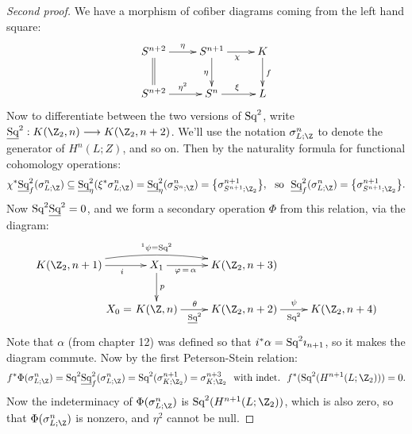 \documentclass[11pt]{article}
\begin{document}
\begin{proof}[Second proof]
We have a morphism of cofiber diagrams coming from the left hand square:
\[\xymatrix{
S^{n+2}\ar[r]^\eta\ar@{=}[d]&\ar[d]_\eta S^{n+1}\ar[r]_\chi&K\ar[d]^f\\
S^{n+2}\ar[r]^{\eta^2}&S^n\ar[r]^\xi&L
}\]
Now to differentiate between the two versions of $\textup{Sq}^2$, write
$\underline{\Squ}^2:K(\Z_2,n)\to K(\Z_2,n+2)$. We'll use the notation
$\sigma^n_{L;\Z}$ to denote the generator of $H^n(L;Z)$, and so on. Then by the
naturality formula for functional cohomology operations:
\[\chi^*\underline{\Squ}^2_f(\sigma^n_{L;\Z})
\subseteq\underline{\Squ}^2_\eta(\xi^*\sigma^n_{L;\Z})
=\underline{\Squ}^2_\eta(\sigma^n_{S^n;\Z})
=\bigl\{\sigma^{n+1}_{S^{n+1};\Z_2}\bigr\},
\text{\ \ so\ \ }
\underline{\Squ}^2_f(\sigma^n_{L;\Z})=\bigl\{\sigma^{n+1}_{S^{n+1};\Z_2}\bigr\}.
\]
Now $\textup{Sq}^2\underline{\textup{Sq}}^2=0$, and we form a secondary operation $\Phi$ from
this relation, via the diagram:
\[\xymatrix{
K(\Z_2,n+1)\ar[r]_{\ \ \ \ \ i}\ar@/^.8pc/[rr]^{^1\psi=\Squ^2}&
X_1\ar[r]_{\phi\,=\,\alpha\ \ \ \ \ \ \ \ }\ar[d]^p&K(\Z_2,n+3)\\
&%
\makebox[0in][r]{$X_0=$\ }K(\Z,n)
\ar[r]^{\theta\ \ \ }_{\underline{\Squ}^2\ \ \ }&
K(\Z_2,n+2)\ar[r]^{\psi}_{\Squ^2}&
K(\Z_2,n+4)
}\]
Note that $\alpha$ (from chapter 12) was defined so that
$i^*\alpha=\textup{Sq}^2\imath_{n+1}$, so it makes the diagram commute. Now by the
first Peterson-Stein relation:
\[f^*\Phi(\sigma^n_{L;\Z})=\Squ^2\underline{\Squ}^2_f(\sigma^n_{L;\Z})
=\Squ^2(\sigma^{n+1}_{K;\Z_2})=\sigma^{n+3}_{K;\Z_2}
\text{ \ with indet.\ \ }f^*(\Squ^2(H^{n+1}(L;\Z_2)))=0.\]
Now the indeterminacy of $\Phi(\sigma^n_{L;\Z})$ is $\Squ^2(H^{n+1}(L;\Z_2))$,
which is also zero, so that $\Phi(\sigma^n_{L;\Z})$ is nonzero, and $\eta^2$
cannot be null.
\end{proof}
\end{document}

